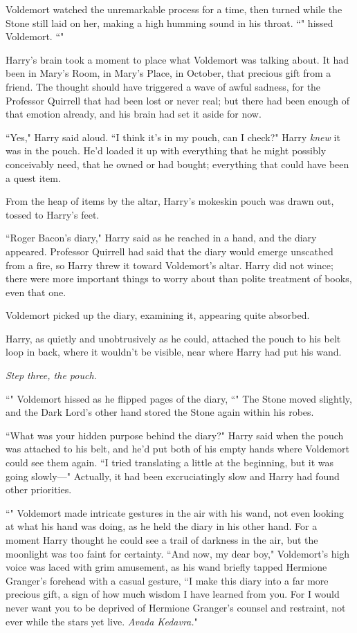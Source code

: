 Voldemort watched the unremarkable process for a time, then turned while the Stone still laid on her, making a high humming sound in his throat. ``" hissed Voldemort. ``"

Harry's brain took a moment to place what Voldemort was talking about. It had been in Mary's Room, in Mary's Place, in October, that precious gift from a friend. The thought should have triggered a wave of awful sadness, for the Professor Quirrell that had been lost or never real; but there had been enough of that emotion already, and his brain had set it aside for now.

``Yes," Harry said aloud. ``I think it's in my pouch, can I check?" Harry \emph{knew} it was in the pouch. He'd loaded it up with everything that he might possibly conceivably need, that he owned or had bought; everything that could have been a quest item.

From the heap of items by the altar, Harry's mokeskin pouch was drawn out, tossed to Harry's feet.

``Roger Bacon's diary," Harry said as he reached in a hand, and the diary appeared. Professor Quirrell had said that the diary would emerge unscathed from a fire, so Harry threw it toward Voldemort's altar. Harry did not wince; there were more important things to worry about than polite treatment of books, even that one.

Voldemort picked up the diary, examining it, appearing quite absorbed.

Harry, as quietly and unobtrusively as he could, attached the pouch to his belt loop in back, where it wouldn't be visible, near where Harry had put his wand.

\emph{Step three, the pouch.}

``" Voldemort hissed as he flipped pages of the diary, ``" The Stone moved slightly, and the Dark Lord's other hand stored the Stone again within his robes.

``What was your hidden purpose behind the diary?" Harry said when the pouch was attached to his belt, and he'd put both of his empty hands where Voldemort could see them again. ``I tried translating a little at the beginning, but it was going slowly—" Actually, it had been excruciatingly slow and Harry had found other priorities.

``" Voldemort made intricate gestures in the air with his wand, not even looking at what his hand was doing, as he held the diary in his other hand. For a moment Harry thought he could see a trail of darkness in the air, but the moonlight was too faint for certainty. ``And now, my dear boy," Voldemort's high voice was laced with grim amusement, as his wand briefly tapped Hermione Granger's forehead with a casual gesture, ``I make this diary into a far more precious gift, a sign of how much wisdom I have learned from you. For I would never want you to be deprived of Hermione Granger's counsel and restraint, not ever while the stars yet live. \emph{Avada Kedavra.}"


